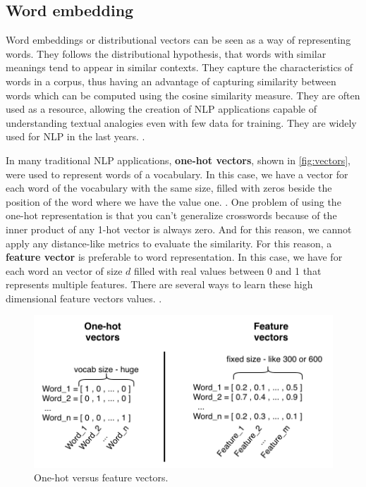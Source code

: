 \subsection{Word embedding}\label{chap:background:we}

Word embeddings or distributional vectors can be seen as a way of representing words. They follows the distributional hypothesis, that words with similar meanings tend to appear in similar contexts. They capture the characteristics of words in a corpus, thus having an advantage of capturing similarity between words which can be computed using the cosine similarity measure. They are often used as a resource, allowing the creation of NLP applications capable of understanding textual analogies even with few data for training. They are widely used for NLP in the last years. \cite{DBLP:journals/corr/abs-1708-02709, Harris1954, Hartmann2017}.


In many traditional NLP applications, \textbf{one-hot vectors}, shown in \autoref{fig:vectors}, were used to represent words of a vocabulary. In this case, we have a vector for each word of the vocabulary with the same size, filled with zeros beside the position of the word where we have the value one. \cite{turian2010word}.
One problem of using the one-hot representation is that you can't generalize crosswords because of the inner product of any 1-hot vector is always zero. And for this reason, we cannot apply any distance-like metrics to evaluate the similarity. For this reason, a \textbf{feature vector} is preferable to word representation. In this case, we have for each word an vector of size $d$ filled with real values between 0 and 1 that represents multiple features. There are several ways to learn these high dimensional feature vectors values. \cite{turian2010word}.

\begin{figure}[h]
	\caption{One-hot versus feature vectors.}
	\label{fig:vectors}
	\centering%
	\begin{minipage}{.7\textwidth}
		\includegraphics[width=\textwidth]{vectors.png}
	\end{minipage}
\end{figure}


